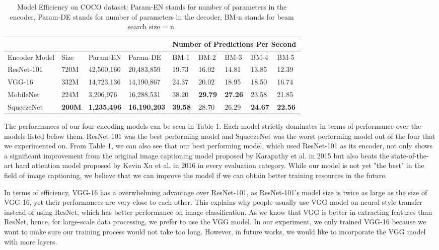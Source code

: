 \documentclass{article}
\begin{document}
\begin{table}[!htbp]
\centering
  \caption{Model Efficiency on COCO dataset: Param-EN stands for number of parameters in the encoder, Param-DE stands for number of parameters in the decoder, BM-n stands for beam search size = n.}
  \label{model-table}
  \centering
  \begin{tabular}{lllllllll}
    \cline{5-9}
    & & & & \multicolumn{5}{|c|}{Number of Predictions Per Second}\\
    \toprule
    Encoder Model & Size & Param-EN & Param-DE & BM-1 & BM-2 & BM-3 & BM-4 & BM-5\\
    \midrule
    ResNet-101 & 720M & 42,500,160 & 20,483,859 & 19.73 & 16.02 & 14.81 & 13.85 & 12.39\\
    VGG-16 & 332M & 14,723,136 & 14,190,867 & 24.37 & 20.02 & 18.95 & 18.50 & 16.74\\
    MobileNet & 224M & 3,206,976 & 16,288,531 & 38.20 & \textbf{29.79} & \textbf{27.26} & 23.58 & 21.85\\
    SqueezeNet & \textbf{200M} & \textbf{1,235,496} & \textbf{16,190,203} & \textbf{39.58} & 28.70 & 26.29 & \textbf{24.67} & \textbf{22.56}\\
    \bottomrule
  \end{tabular}
\end{table}

The performances of our four encoding models can be seen in Table 1. Each model strictly dominates in terms of performance over the models listed below them. ResNet-101 was the best performing model and SqueezeNet was the worst performing model out of the four that we experimented on. From Table 1, we can also see that our best performing model, which used ResNet-101 as its encoder, not only shows a significant improvement from the original image captioning model proposed by Karapathy et al. in 2015 but also beats the state-of-the-art hard attention model proposed by Kevin Xu et al. in 2016 in every evaluation category. While our model is not yet "the best" in the field of image captioning, we believe that we can improve the model if we can obtain better training resources in the future.

In terms of efficiency, VGG-16 has a overwhelming advantage over ResNet-101, as ResNet-101’s model size is twice as large as the size of VGG-16, yet their performances are very close to each other. This explains why people usually use VGG model on neural style transfer instead of using ResNet, which has better performance on image classification. As we know that VGG is better in extracting features than ResNet, hence, for large-scale data processing, we prefer to use the VGG model. In our experiment, we only trained VGG-16 because we want to make sure our training process would not take too long. However, in future works, we would like to incorporate the VGG model with more layers. 
\end{document}
